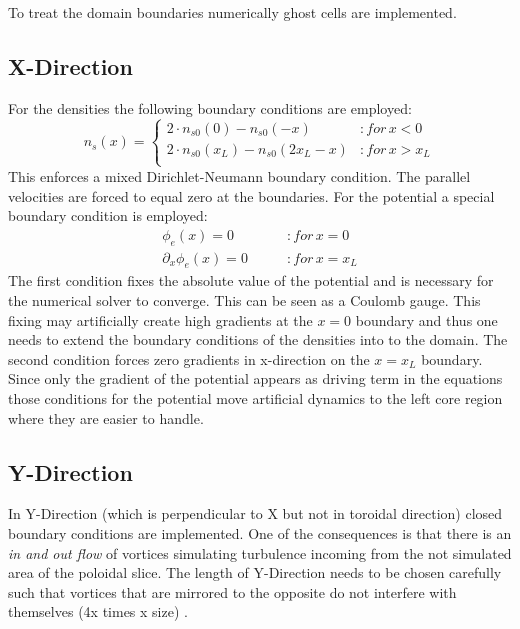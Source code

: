 \documentclass[master.tex]{subfiles}
\begin{document}
To treat the domain boundaries numerically ghost cells are implemented. 

\subsection{X-Direction}
For the densities the following boundary conditions are employed:
\begin{equation}
    n_s(x) = \begin{cases}
        2 \cdot n_{s0}(0) - n_{s0}(-x) &\colon for \, x < 0 \\
        2 \cdot n_{s0}(x_L) - n_{s0}(2x_L-x) &\colon for \, x > x_L \\
    \end{cases}
\end{equation}
This enforces a mixed Dirichlet-Neumann boundary condition.
The parallel velocities are forced to equal zero at the boundaries.
For the potential a special boundary condition is employed:
\begin{align}
    \phi_e(x) = 0 \qquad &\colon for \, x = 0\\
    \partial_x\phi_e(x) = 0 \qquad &\colon for \, x = x_L \label{eq:boundary-potential-right}
\end{align}
The first condition fixes the absolute value of the potential and is necessary for the numerical solver to converge. This can be seen as a Coulomb gauge. This fixing may artificially create high gradients at the $x=0$ boundary and thus one needs to extend the boundary conditions of the densities into to the domain. The second condition forces zero gradients in x-direction on the $x=x_L$ boundary. Since only the gradient of the potential appears as driving term in the equations those conditions for the potential move artificial dynamics to the left core region where they are easier to handle. 

\subsection{Y-Direction}
In Y-Direction (which is perpendicular to X but not in toroidal direction) closed boundary conditions are implemented. One of the consequences is that there is an \textit{in and out flow} of vortices simulating turbulence incoming from the not simulated area of the poloidal slice. The length of Y-Direction needs to be chosen carefully such that vortices that are mirrored to the opposite do not interfere with themselves (4x times x size) \cite{ScottComputationMagneticallyConfinedPlasmas}.
\end{document}
